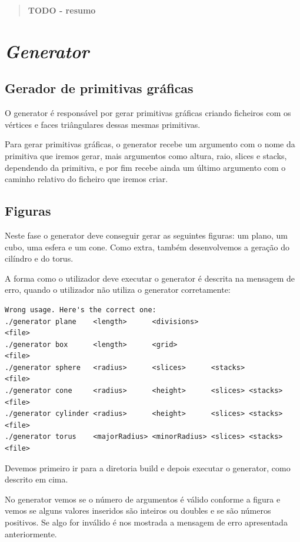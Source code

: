 \documentclass[12pt, a4paper]{article}
\begin{document}
\pagebreak

\begin{abstract}
    \textbf{\color{red} TODO - resumo}
\end{abstract}

\section{\emph{Generator}}

\subsection{Gerador de primitivas gráficas}
O generator é responsável por gerar primitivas gráficas criando ficheiros com os
vértices e faces triângulares dessas mesmas primitivas.

Para gerar primitivas gráficas, o generator recebe um argumento com o nome
da primitiva que iremos gerar, mais argumentos como altura, raio, slices e stacks,
dependendo da primitiva, e por fim recebe ainda um último argumento com o caminho relativo
do ficheiro que iremos criar.
\subsection{Figuras}
Neste fase o generator deve conseguir gerar as seguintes figuras: um plano, um cubo,
uma esfera e um cone. Como extra, também desenvolvemos a geração do cilíndro e do torus.

A forma como o utilizador deve executar o generator é descrita na mensagem de erro, quando
o utilizador não utiliza o generator corretamente:
\begin{verbatim}
Wrong usage. Here's the correct one:
./generator plane    <length>      <divisions>                     <file>
./generator box      <length>      <grid>                          <file>
./generator sphere   <radius>      <slices>      <stacks>          <file>
./generator cone     <radius>      <height>      <slices> <stacks> <file>
./generator cylinder <radius>      <height>      <slices> <stacks> <file>
./generator torus    <majorRadius> <minorRadius> <slices> <stacks> <file>
\end{verbatim}
Devemos primeiro ir para a diretoria build e depois executar o generator, como descrito em cima.

No generator vemos se o número de argumentos é válido conforme a figura e vemos se alguns valores
inseridos são inteiros ou doubles e se são números positivos. Se algo for inválido é nos mostrada
a mensagem de erro apresentada anteriormente.
\end{document}
